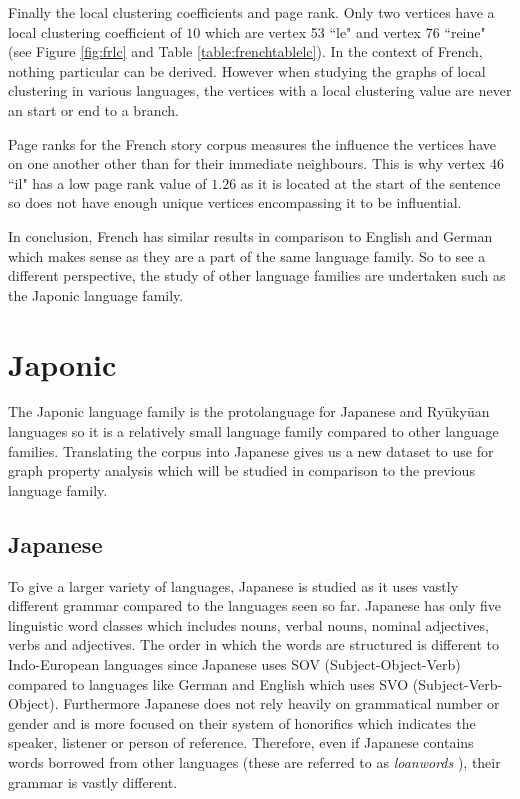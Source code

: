 Finally the local clustering coefficients and page rank. Only two vertices have a local clustering coefficient of $10$ which are vertex 53 ``le" and vertex 76 ``reine" (see Figure \ref{fig:frlc} and Table \ref{table:frenchtablelc}). In the context of French, nothing particular can be derived. However when studying the graphs of local clustering in various languages, the vertices with a local clustering value are never an start or end to a branch.

Page ranks for the French story corpus measures the influence the vertices have on one another other than for their immediate neighbours. This is why vertex 46 ``il" has a low page rank value of $1.26$ as it is located at the start of the sentence so does not have enough unique vertices encompassing it to be influential.

In conclusion, French has similar results in comparison to English and German which makes sense as they are a part of the same language family. So to see a different perspective, the study of other language families are undertaken such as the Japonic language family.

\section{Japonic}
The Japonic language family is the protolanguage for Japanese and Ryūkyūan languages \cite{vovin2017origins} so it is a relatively small language family compared to other language families. Translating the corpus into Japanese gives us a new dataset to use for graph property analysis which will be studied in comparison to the previous language family.
\subsection{Japanese}
To give a larger variety of languages, Japanese is studied as it uses vastly different grammar compared to the languages seen so far. Japanese has only five linguistic word classes which includes nouns, verbal nouns, nominal adjectives, verbs and adjectives. The order in which the words are structured is different to Indo-European languages since Japanese uses SOV (Subject-Object-Verb) compared to languages like German and English which uses SVO (Subject-Verb-Object). Furthermore Japanese does not rely heavily on grammatical number or gender and is more focused on their system of honorifics which indicates the speaker, listener or person of reference. Therefore, even if Japanese contains words borrowed from other languages (these are referred to as \emph{loanwords} \cite{miura1979influence}), their grammar is vastly different. 

